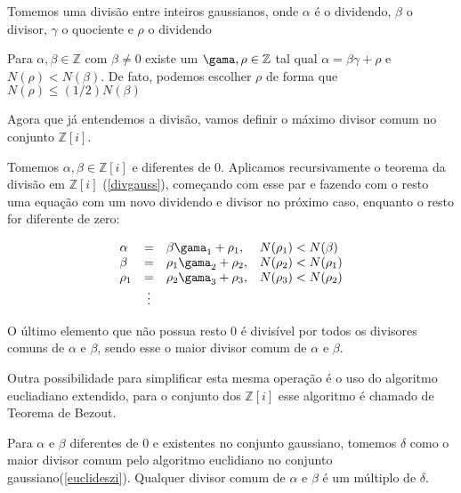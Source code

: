 Tomemos uma divis\~ao entre inteiros gaussianos, onde $\alpha$ \'e o dividendo, $\beta$ o divisor, $\gamma$ o quociente e $\rho$ o dividendo

\begin{Th}  \label{divgauss}

Para $\alpha, \beta \in \mathbb{Z}$ com $\beta \neq 0$ existe um $\gama, \rho \in \mathbb{Z}$ tal qual $\alpha = \beta \gamma + \rho$ e $N(\rho) < N(\beta)$. De fato, podemos escolher $\rho$  de forma que $N(\rho) \leq (1/2)N(\beta)$

\end{Th}

Agora que j\'a entendemos a divis\~ao, vamos definir o m\'aximo divisor comum no conjunto $\mathbb{Z}[i]$.

\begin{Th}
\label{euclideszi}

Tomemos $\alpha , \beta \in \mathbb{Z}[i]$ e diferentes de $0$. Aplicamos recursivamente o teorema da divis\~ao em $\mathbb{Z}[i]$ (\ref{divgauss}), come\c{c}ando com esse par e fazendo com o resto uma  equa\c{c}\~ao com um novo dividendo e divisor no pr\'oximo caso, enquanto o resto for diferente de zero:

\[
\begin{array}{lcll}
\alpha & = & \beta \gama_1 + \rho_1,  & N(\rho_1) < N(\beta)  \\
\beta  & = & \rho_1 \gama_2 + \rho_2, & N(\rho_2) < N(\rho_1) \\
\rho_1 & = & \rho_2 \gama_3 + \rho_3, & N(\rho_3) < N(\rho_2) \\
& \vdots &  &\\
\end{array}
\]

O \'ultimo elemento que n\~ao possua resto $0$ \'e divis\'ivel por todos os divisores comuns de $\alpha$ e $\beta$, sendo esse o maior divisor comum de $\alpha$ e $\beta$.

\end{Th}

Outra possibilidade para simplificar esta mesma opera\c{c}\~ao \'e o uso do algoritmo eucliadiano extendido, para o conjunto dos $\mathbb{Z}[i]$ esse algoritmo \'e chamado de Teorema de Bezout.

\begin{Cor} \label{cor}
	Para $\alpha$ e $\beta$ diferentes de $0$ e existentes no conjunto gaussiano, tomemos $\delta$ como o maior divisor comum pelo algoritmo euclidiano no conjunto gaussiano(\ref{euclideszi}). Qualquer divisor comum de $\alpha$ e $\beta$ \'e um m\'ultiplo de $\delta$.
\end{Cor}

